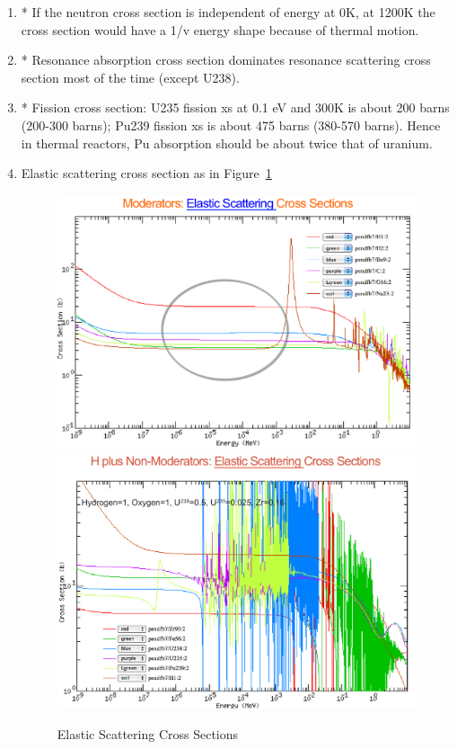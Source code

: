 \documentclass{school-22.211-notes}
\begin{document}
\clearpage
{}
\begin{enumerate}
\item* If the neutron cross section is independent of energy at 0K, at 1200K the cross section would have a 1/v energy shape because of thermal motion. 
  
\item* Resonance absorption cross section dominates resonance scattering cross section most of the time (except U238). 

\item* Fission cross section: U235 fission xs at 0.1 eV and 300K is about 200 barns (200-300 barns); Pu239 fission xs is about 475 barns (380-570 barns). Hence in thermal reactors, Pu absorption should be about twice that of uranium. 

\item Elastic scattering cross section as in Figure~\ref{scatter-xs}
\begin{figure}
  \centering
  \includegraphics[width=6in]{images/intro/scatter-xs-moderator.png}
  \\
  \includegraphics[width=6in]{images/intro/scatter-xs-LWR.png}
  \caption{Elastic Scattering Cross Sections} \label{scatter-xs}
\end{figure}


\end{enumerate}
\end{document}
